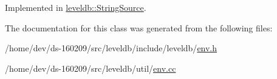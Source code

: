 Implemented in \hyperlink{classleveldb_1_1_string_source_a7cf8d6ee4cd01cf514ce68326e6ec3c2}{leveldb\+::\+String\+Source}.



The documentation for this class was generated from the following files\+:\begin{DoxyCompactItemize}
\item 
/home/dev/ds-\/160209/src/leveldb/include/leveldb/\hyperlink{env_8h}{env.\+h}\item 
/home/dev/ds-\/160209/src/leveldb/util/\hyperlink{env_8cc}{env.\+cc}\end{DoxyCompactItemize}
